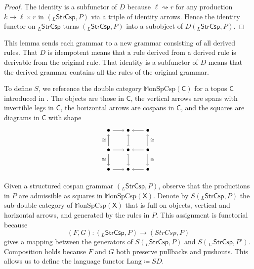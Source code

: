 \documentclass{amsart}
\newcommand{\C}{\cat{C}}
\newcommand{\X}{\cat{X}}
\newcommand{\StrCsp}{\cat{StrCsp}}
\newcommand{\MonSpCsp}{\dblcat{M} \textrm{onSpCsp}}
\newcommand{\Lang}{\mathrm{Lang}}
\newcommand{\cat}[1]{\mathsf{#1}}
\newcommand{\dblcat}[1]{\mathbb{#1}}
\newcommand{\from}{\colon}
\newcommand{\dderiv}[2]{#1 \rightsquigarrow #2}
\newcommand{\spn}[3]{#2 \to #1 \times #3}
\theoremstyle{remark}
\theoremstyle{definition}
\begin{document}
\begin{proof}
    The identity is a subfunctor of $ D $ because
    $ \dderiv{\ell}{r} $ for any production
    $ \spn{\ell}{k}{r} $ in $ ( _{L}\StrCsp , P ) $ via a
    triple of identity arrows. Hence the identity functor on
    $ _{L}\StrCsp $ turns $ ( _{L}\StrCsp , P ) $ into a
    subobject of $ D ( _{L}\StrCsp , P ) $.
\end{proof}

This lemma sends each grammar to a new grammar consisting of
all derived rules.  That $ D $ is idempotent means that a
rule derived from a derived rule is derivable from the
original rule.  That identity is a subfunctor of $ D $ means
that the derived grammar contains all the rules of the
original grammar.

To define $ S $, we reference the double category
$ \MonSpCsp (\C) $ for a topos $ \C $ introduced in
\cite{CicCour_SpCspTopos}.  The objects are those in $ \C $,
the vertical arrows are spans with invertible legs in
$ \C $, the horizontal arrows are cospans in $ \C $, and the
squares are diagrams in $ \C $ with shape
%
\[
\begin{tikzpicture}
  \node (00) at (0,0) {$ \bullet $};
  \node (01) at (0,1) {$ \bullet $};
  \node (02) at (0,2) {$ \bullet $};
  \node (10) at (1,0) {$ \bullet $};
  \node (11) at (1,1) {$ \bullet $};
  \node (12) at (1,2) {$ \bullet $};
  \node (20) at (2,0) {$ \bullet $};
  \node (21) at (2,1) {$ \bullet $};
  \node (22) at (2,2) {$ \bullet $};
  \draw [->] (02) to node [] {\scriptsize{$  $}} (12);
  \draw [->] (22) to node [] {\scriptsize{$  $}} (12);
  \draw [->] (01) to node [] {\scriptsize{$  $}} (11);
  \draw [->] (21) to node [] {\scriptsize{$  $}} (11);
  \draw [->] (00) to node [] {\scriptsize{$  $}} (10);
  \draw [->] (20) to node [] {\scriptsize{$  $}} (10);
  \draw [->] (01) to node [left] {\scriptsize{$ \cong  $}} (02);
  \draw [->] (01) to node [left] {\scriptsize{$ \cong $}} (00);
  \draw [>->] (11) to node [] {\scriptsize{$  $}} (12);
  \draw [>->] (11) to node [] {\scriptsize{$  $}} (10);
  \draw [->] (21) to node [right] {\scriptsize{$ \cong $}} (22);
  \draw [->] (21) to node [right] {\scriptsize{$ \cong $}} (20);
\end{tikzpicture}
\]
%

Given a structured cospan grammar $ ( _{L}\StrCsp , P ) $,
observe that the productions in $ P $ are admissible as
squares in $ \MonSpCsp (\X) $. Denote by
$ S ( _{L}\StrCsp , P ) $ the sub-double category of
$ \MonSpCsp ( \X ) $ that is full on objects, vertical and
horizontal arrows, and generated by the rules in
$ P $. This assignment is functorial because
\[
  (F,G) \from ( _{L}\StrCsp , P ) \to ( StrCsp , P )
\]
gives a mapping between the generators of
$ S ( _{L}\StrCsp , P ) $ and $ S ( _{L'}\StrCsp , P' ) $.
Composition holds because $ F $ and $ G $ both preserve
pullbacks and pushouts. This allows us to define the
language functor $ \Lang \coloneqq SD $.
\end{document}
